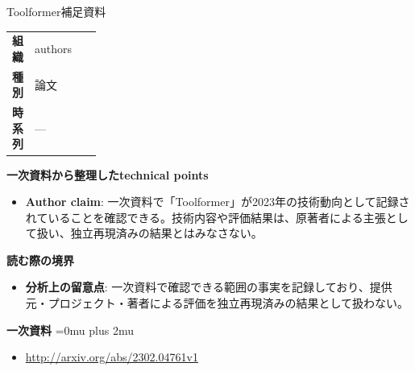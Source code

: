 \begin{technicalnote}{Toolformer}{補足資料}
\begingroup
\begin{tabularx}{\linewidth}{@{}>{\bfseries}p{0.22\linewidth}X@{}}
組織 & authors \\
種別 & 論文 \\
時系列 & — \\
\end{tabularx}
\smallskip
{\bfseries 一次資料から整理したtechnical points}
\begin{itemize}[leftmargin=1.5em,itemsep=0.35em]
\item \textbf{Author claim}: 一次資料で「Toolformer」が2023年の技術動向として記録されていることを確認できる。技術内容や評価結果は、原著者による主張として扱い、独立再現済みの結果とはみなさない。
\end{itemize}
\begin{minipage}{\linewidth}
{\bfseries 読む際の境界}
\begin{itemize}[leftmargin=1.5em,itemsep=0.35em]
\item \textbf{分析上の留意点}: 一次資料で確認できる範囲の事実を記録しており、提供元・プロジェクト・著者による評価を独立再現済みの結果として扱わない。
\end{itemize}
\begin{samepage}
{\bfseries 一次資料}
\begingroup\sloppy
\Urlmuskip=0mu plus 2mu\relax
\begin{itemize}[leftmargin=1.5em,itemsep=0.25em]
\item {\scriptsize\url{http://arxiv.org/abs/2302.04761v1}}
\end{itemize}
\endgroup
\end{samepage}
\end{minipage}
\endgroup
\end{technicalnote}
\medskip
